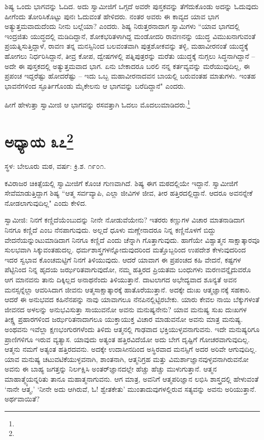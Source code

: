 ಶಿಷ್ಯ ಒಂದು ಭಾಗವನ್ನು ಓದಿದ. ಅದು ಸ್ವಾಮೀಜಿಗೆ ಒಗ್ಗದೆ ಅವರೇ ಪುಸ್ತಕವನ್ನು ತೆಗೆದುಕೊಂಡು ಅದನ್ನು ಓದುವುದು ಹೀಗೆಂದು ತೋರಿಸಿಕೊಟ್ಟು ಪುನಃ ಓದುವಂತೆ ಹೇಳಿದರು. ನಂತರ ಅವರು ಈ ಕಾವ್ಯದ ಯಾವ ಭಾಗ ಅತ್ಯುತ್ತಮವಾದುದೆಂದು ನೀನು ಬಲ್ಲೆಯಾ? ಎಂದರು. ಶಿಷ್ಯ ನಿರುತ್ತರನಾದಾಗ ಸ್ವಾಮಿಗಳು “ಯಾವ ಭಾಗದಲ್ಲಿ ಇಂದ್ರಜಿತು ಯುದ್ಧದಲ್ಲಿ ಮಡಿದಿದ್ದಾನೆ, ಶೋಕಭರಿತಳಾಗಿದ್ದ ಮಂಡೋದರಿ ರಾವಣನನ್ನು ಯುದ್ಧ ವಿಮುಖನಾಗುವಂತೆ ಪ್ರಯತ್ನಿಸುತ್ತಿದ್ದಾಳೆ, ರಾವಣ ತನ್ನ ಮನಸ್ಸಿನಿಂದ ಬಲವಂತವಾಗಿ ಪುತ್ರಶೋಕವನ್ನು ತಳ್ಳಿ, ಮಹಾವೀರನಂತೆ ಯುದ್ಧಕ್ಕೆ ಹೋಗಲು ನಿರ್ಧರಿಸಿದ್ದಾನೆ, ತೀವ್ರ ಕೋಪ, ದ್ವೇಷಗಳಲ್ಲಿ ಪತ್ನಿಪುತ್ರರನ್ನು ಮರೆತು ಯುದ್ಧಕ್ಕೆ ನುಗ್ಗಲು ಸಿದ್ಧನಾಗಿದ್ದಾನೆ – ಅದೇ ಈ ಪುಸ್ತಕದಲ್ಲಿ ಅತ್ಯುತ್ತಮವಾದ ಭಾಗ. ಏನು ಬೇಕಾದರೂ ಬರಲಿ ನನ್ನ ಕರ್ತವ್ಯವನ್ನು ಮರೆಯುವುದಿಲ್ಲ, ಈ ಪ್ರಪಂಚ ಇದ್ದರೆಷ್ಟು ಹೋದರೆಷ್ಟು – ಇದು ಒಬ್ಬ ಮಹಾವೀರನಾದವನ ಬಾಯಲ್ಲಿ ಬರುವಂತಹ ಮಾತುಗಳು. ಇಂತಹ ಭಾವನೆಗಳಿಂದ ಸ್ಫೂರ್ತಿಗೊಂಡು ಮೈಕೇಲನು ಆ ಭಾಗವನ್ನು ಬರೆದಿದ್ದಾನೆ" ಎಂದರು.

ಹೀಗೆ ಹೇಳುತ್ತಾ ಸ್ವಾಮೀಜಿ ಆ ಭಾಗವನ್ನು ರಸವತ್ತಾಗಿ ಓದಲು ಮೊದಲುಮಾಡಿದರು.\footnote{}

\newpage

\chapter[ಅಧ್ಯಾಯ ೩೭]{ಅಧ್ಯಾಯ ೩೭\protect\footnote{}}

\centerline{ಸ್ಥಳ: ಬೇಲೂರು ಮಠ, ವರ್ಷ: ಕ್ರಿ.ಶ. ೧೯೦೧.}

ಕವಿರಾಜರ ಚಿಕಿತ್ಸೆಯಲ್ಲಿ ಸ್ವಾಮೀಜಿಗೆ ಕೊಂಚ ಗುಣವಾಗಿದೆ. ಶಿಷ್ಯ ಈಗ ಮಠದಲ್ಲಿಯೇ ಇದ್ದಾನೆ. ಸ್ವಾಮೀಜಿಗೆ ಸೇವೆಮಾಡುತ್ತಿದ್ದಾಗ ಶಿಷ್ಯ “ಆತ್ಮ ಸರ್ವವ್ಯಾಪಿ, ಎಲ್ಲಾ ಜೀವಿಗಳ ಜೀವ, ತೀರ ಹತ್ತಿರದಲ್ಲಿದ್ದಾನೆ. ಆದರೂ ಅವನನ್ನೇಕೆ ನೋಡಲಾಗುವುದಿಲ್ಲ" ಎಂದು ಕೇಳಿದ.

ಸ್ವಾಮೀಜಿ: ನಿನಗೆ ಕಣ್ಣಿದೆಯೆಂಬುದನ್ನು ನೀನೇ ನೋಡುವೆಯೇನು? ಇತರರು ಕಣ್ಣುಗಳ ವಿಚಾರ ಮಾತನಾಡಿದಾಗ ನಿನಗೂ ಕಣ್ಣಿದೆ ಎಂಬ ನೆನಪಾಗುವುದು. ಅಲ್ಲದೆ ಧೂಳು ಮಣ್ಣೇನಾದರೂ ನಿನ್ನ ಕಣ್ಣಿನೊಳಗೆ ಬಿದ್ದು ವೇದನೆಯನ್ನುಂಟುಮಾಡಿದಾಗ ನಿನಗೂ ಕಣ್ಣಿದೆ ಎಂದು ಚೆನ್ನಾಗಿ ಗೊತ್ತಾಗುವುದು. ಹಾಗೆಯೇ ವಿಶ್ವಾತ್ಮನ ಸಾಕ್ಷಾತ್ಕಾರವೂ ಸುಲಭವಾಗಿ ಸಿಕ್ಕುವಂತಹುದಲ್ಲ. ಧರ್ಮಶಾಸ್ತ್ರಗಳನ್ನೋದುವುದರಿಂದ ಮತ್ತೊಬ್ಬರಿಂದ ಉಪದೇಶ ಕೇಳುವುದರಿಂದ ಇದರ ಸ್ವಭಾವ ಕೊಂಚಮಟ್ಟಿಗೆ ನಿನಗೆ ತಿಳಿಯುವುದು. ಆದರೆ ಯಾವಾಗ ಈ ಪ್ರಪಂಚದ ಕಹಿ ವೇದನೆ, ಕಷ್ಟಗಳ ಪೆಟ್ಟಿನಿಂದ ನಿನ್ನ ಹೃದಯ ಜರ್ಝರಿತವಾಗುವುದೋ, ನಮ್ಮ ಹತ್ತಿರದ ಪ್ರಿಯತಮ ಬಂಧುಗಳು ಮರಣವನ್ನೈದುವರೊ ಆಗ ಮಾನವನು ತಾನು ದಿಕ್ಕಿಲ್ಲದ ಅನಾಥನೆಂದು ತಿಳಿಯುತ್ತಾನೆ. ದಾಟಲಾಗದ ಅಭೇದ್ಯವಾದ ಶೂನ್ಯತೆ ಅವನ ಮನಸ್ಸನ್ನೆಲ್ಲಾ ಆವರಿಸಿದಾಗ ಜೀವನು ಆತ್ಮಸಾಕ್ಷಾತ್ಕಾರಕ್ಕೆ ಹಾತೊರೆಯುತ್ತಾನೆ. ಅದಕ್ಕೇ ದುಃಖ ಆತ್ಮಜ್ಞಾನಕ್ಕೆ ಸಹಕಾರಿ. ಆದರೆ ಈ ಅನುಭವದ ಕಹಿನೆನಪನ್ನು ನಾವು ಯಾವಾಗಲೂ ನೆನಪಿನಲ್ಲಿಟ್ಟಿರಬೇಕು. ಯಾರು ಕೇವಲ ನಾಯಿ ಬೆಕ್ಕುಗಳಂತೆ ಜೀವನದ ಅಳಲನ್ನು ಅನುಭವಿಸುತ್ತಾ ಸಾಯುವನೋ ಅವನು ಮನುಷ್ಯನೇನು? ಯಾವ ಮನುಷ್ಯ ಸುಖ ದುಃಖಗಳ ತೀಕ್ಷ್ಣ ಪ್ರಹಾರಗಳಿಂದ ಜರ್ಝರಿತನಾದಾಗಲೂ ಯುಕ್ತಾಯುಕ್ತ ವಿಚಾರ ಮಾಡುವನೋ ಅವನು ಮಾತ್ರ ಮನುಷ್ಯ. ಅಂಥವನು ಇವೆಲ್ಲಾ ಕ್ಷಣಭಂಗುರಗಳೆಂದು ತಿಳಿದು ಆತ್ಮನಲ್ಲಿ ಗಾಢವಾದ ಭಕ್ತಿಯುಳ್ಳವನಾಗುವನು. ಇದೇ ಮನುಷ್ಯರಿಗೂ ಪ್ರಾಣಿಗಳಿಗೂ ಇರುವ ವ್ಯತ್ಯಾಸ. ಯಾವುದು ಅತ್ಯಂತ ಹತ್ತಿರವಿದೆಯೋ ಅದು ಬೇಗ ದೃಷ್ಟಿಗೆ ಗೋಚರವಾಗುವುದಿಲ್ಲ. ಆತ್ಮನು ನಮಗೆ ಅತ್ಯಂತ ಹತ್ತಿರದವನು. ಅದಕ್ಕೇ ಉದಾಸೀನದಿಂದ ಅಸ್ಥಿರವಾದ ಮನಸ್ಸಿಗೆ ಅದರ ಅರಿವೇ ಆಗುವುದಿಲ್ಲ. ಯಾವ ಮನುಷ್ಯ ಚಟುವಟಿಕೆಯುಳ್ಳವನಾಗಿ, ಶಾಂತನಾಗಿ, ಆತ್ಮನಿಗ್ರಹ ಮತ್ತು ವಿಮರ್ಶಾಜ್ಞಾನವುಳ್ಳವನಾಗಿರುವನೋ ಅವನು ಈ ಬಾಹ್ಯ ಜಗತ್ತನ್ನು ನಿರ್ಲಕ್ಷಿಸಿ ಅಂತರ್‌ಜ್ಞಾನದಲ್ಲೇ ಹೆಚ್ಚು ಹೆಚ್ಚು ಮುಳುಗುತ್ತಾನೆ. ಆತ್ಮನ ಮಾಹಾತ್ಮ್ಯೆಯನ್ನರಿತು ತಾನೂ ಮಹಾತ್ಮನಾಗುವನು. ಆಗ ಮಾತ್ರ, ಅವನಿಗೆ ಆತ್ಮಪರಿಜ್ಞಾನ ಲಭಿಸಿ ಶಾಸ್ತ್ರದಲ್ಲಿ ಹೇಳುವಂತೆ ‘ನಾನೇ ಆತ್ಮ,’ ‘ನೀನೇ ಅದು ಆಗಿರುವೆ, ಓ! ಶ್ವೇತಕೇತು’ ಮುಂತಾದುವುಗಳಲ್ಲಿರುವ ಸತ್ಯವನ್ನು ಅವನು ಅರಿಯುತ್ತಾನೆ. ಅರ್ಥವಾಯಿತೆ?

